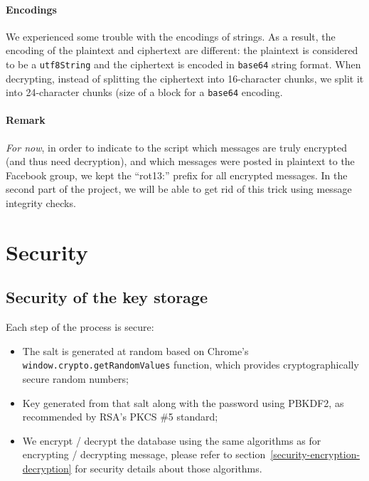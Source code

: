 \documentclass[10pt,twocolumn]{article}
\begin{document}
\paragraph{Encodings}
We experienced some trouble with the encodings of strings. As a result, the encoding of the plaintext and ciphertext are different: the plaintext is considered to be a \texttt{utf8String} and the ciphertext is encoded in \texttt{base64} string format. When decrypting, instead of splitting the ciphertext into 16-character chunks, we split it into 24-character chunks (size of a block for a \texttt{base64} encoding.

\paragraph{Remark}
\textit{For now}, in order to indicate to the script which messages are truly encrypted (and thus need decryption), and which messages were posted in plaintext to the Facebook group, we kept the ``rot13:'' prefix for all encrypted messages. In the second part of the project, we will be able to get rid of this trick using message integrity checks.




\section{Security}
\label{sec:security}

\subsection{Security of the key storage}

Each step of the process is secure:
\begin{itemize}
  \item The salt is generated at random based on Chrome's \texttt{window.crypto.getRandomValues} function, which provides cryptographically secure random numbers;
  \item Key generated from that salt along with the password using PBKDF2, as recommended by RSA's PKCS \#5 standard;
  \item We encrypt / decrypt the database using the same algorithms as for encrypting / decrypting message, please refer to section~\ref{security-encryption-decryption} for security details about those algorithms.
\end{itemize}
\end{document}
